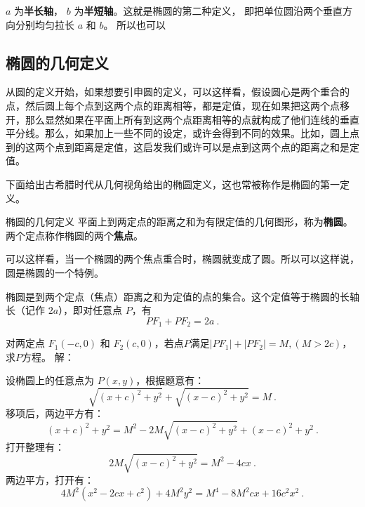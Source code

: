$a$ 为\textbf{半长轴}， $b$ 为\textbf{半短轴}。这就是椭圆的第二种定义， 即把单位圆沿两个垂直方向分别均匀拉长 $a$ 和 $b$。 所以也可以

\subsection{椭圆的几何定义}

从圆的定义开始，如果想要引申圆的定义，可以这样看，假设圆心是两个重合的点，然后圆上每个点到这两个点的距离相等，都是定值，现在如果把这两个点移开，那么显然如果在平面上所有到这两个点距离相等的点就构成了他们连线的垂直平分线。那么，如果加上一些不同的设定，或许会得到不同的效果。比如，圆上点到的这两个点到距离是定值，这启发我们或许可以是点到这两个点的距离之和是定值。

下面给出古希腊时代从几何视角给出的椭圆定义，这也常被称作是椭圆的第一定义。

\begin{definition}{椭圆的几何定义}
平面上到两定点的距离之和为有限定值的几何图形，称为\textbf{椭圆}。两个定点称作椭圆的两个\textbf{焦点}。
\end{definition}

可以这样看，当一个椭圆的两个焦点重合时，椭圆就变成了圆。所以可以这样说，圆是椭圆的一个特例。

椭圆是到两个定点（焦点）距离之和为定值的点的集合。这个定值等于椭圆的长轴长（记作 $2a$），即对任意点 $P$，有
\begin{equation}\label{eq_Elips3_9}
PF_1 + PF_2 = 2a ~.
\end{equation}


\begin{example}{对两定点 $F_1(-c, 0)$ 和 $F_2(c, 0)$，若点$P$满足$|PF_1| + |PF_2| = M,(M > 2c)$，求$P$方程。}
解：

设椭圆上的任意点为 $P(x, y)$，根据题意有：
\begin{equation}
\sqrt{(x + c)^2 + y^2} + \sqrt{(x - c)^2 + y^2} = M~.
\end{equation}
移项后，两边平方有：
\begin{equation}
(x + c)^2 + y^2 = M^2 - 2M\sqrt{(x - c)^2 + y^2} + (x - c)^2 + y^2~.
\end{equation}
打开整理有：
\begin{equation}
2M\sqrt{(x - c)^2 + y^2}= M^2 - 4cx~.
\end{equation}
两边平方，打开有：
\begin{equation}
4M^2(x^2 - 2cx+c^2) + 4M^2y^2= M^4-8M^2cx+16c^2x^2~.
\end{equation}
\end{example}



